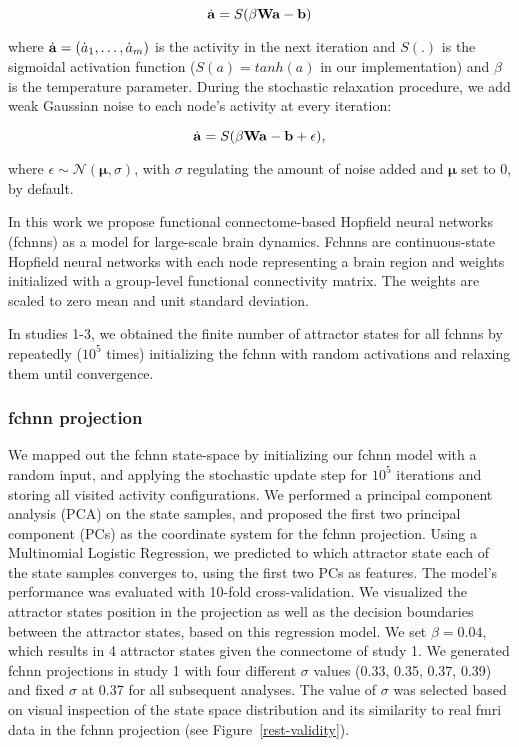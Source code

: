 \documentclass{article}
\begin{document}
\begin{equation}
\label{hopfield-update-matrix}
\dot{\bold{a}} = S(\beta \bold{W} \bold{a} - \bold{b})
\end{equation}

where $\dot{\bold{a}} = (\dot{a}_1, \dots, \dot{a}_m)$ is the activity in the next iteration and $S(.)$ is the sigmoidal activation function ($S(a) = tanh(a)$ in our implementation) and $\beta$ is the temperature parameter.
During the stochastic relaxation procedure, we add weak Gaussian noise to each node's activity at every iteration:

\begin{equation}
\label{hopfield-update-matrix-stochastic}
\dot{\bold{a}} = S(\beta \bold{W} \bold{a} - \bold{b}  + \epsilon),
\end{equation}

where $\epsilon \sim \mathcal{N}(\mathbf{\mu}, \sigma)$, with $\sigma$ regulating the amount of noise added and $\mathbf{\mu}$ set to 0, by default.

In this work we propose functional connectome-based Hopfield neural networks (\acrshort{fchnn}s) as a model for large-scale brain dynamics.
Fc\acrshort{hnn}s are continuous-state Hopfield neural networks with each node representing a brain region and weights initialized with a group-level functional connectivity matrix. The weights are scaled to zero mean and unit standard deviation.

In studies 1-3, we obtained the finite number of attractor states for all \acrshort{fchnn}s by repeate\acrshort{dl}y ($10^5$ times) initializing the \acrshort{fchnn} with random activations and relaxing them until convergence.

\subsubsection{\acrshort{fchnn} projection}

We mapped out the \acrshort{fchnn} state-space by initializing our \acrshort{fchnn} model with a random input, and applying the stochastic update step for $10^5$ iterations and storing all visited activity configurations.
We performed a principal component analysis (PCA) on the state samples, and proposed the first two principal component (PCs) as the coordinate system for the \acrshort{fchnn} projection. Using a Multinomial Logistic Regression, we predicted to which attractor state each of the state samples converges to, using the first two PCs as features. The model's performance was evaluated with 10-fold cross-validation. We visualized the attractor states position in the projection as well as the decision boundaries between the attractor states, based on this regression model. We set $\beta = 0.04$, which results in 4 attractor states given the connectome of study 1. We generated \acrshort{fchnn} projections in study 1 with four different $\sigma$ values (0.33, 0.35, 0.37, 0.39) and fixed $\sigma$ at 0.37 for all subsequent analyses. The value of $\sigma$ was selected based on visual inspection of the state space distribution and its similarity to real \acrshort{fmri} data in the \acrshort{fchnn} projection (see Figure~\ref{rest-validity}).
\end{document}
